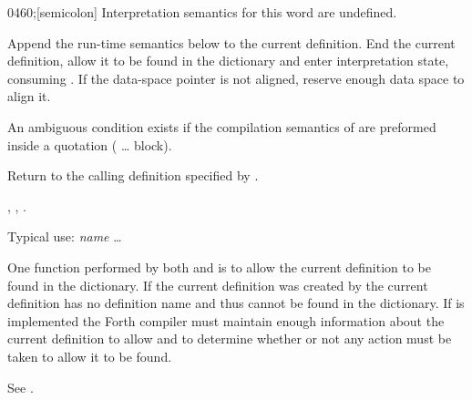 \pagebreak
\begin{worddef}{0460}{;}[semicolon]
\interpret
	Interpretation semantics for this word are undefined.

\compile

	Append the run-time semantics below to the current definition. End
	the current definition, allow it to be found in the dictionary and
	enter interpretation state, consuming . If the
	data-space pointer is not aligned, reserve enough data space to
	align it.

	An ambiguous condition exists if the compilation semantics of
	\word{;} are preformed inside a quotation (\word[tools]{[:} {\ldots}
	\word[tools]{;]} block).
	
\runtime
	\stack{}{}

	Return to the calling definition specified by .

\see {},
	,
	.

	\begin{rationale} %
		Typical use:
			\word{:} \emph{name} {\ldots} \word{;}

		One function performed by both \word{;} and 
		is to allow the current definition to be found in the
		dictionary. If the current definition was created by
		 the current definition has no definition name
		and thus cannot be found in the dictionary. If 
		is implemented the Forth compiler must maintain enough
		information about the current definition to allow \word{;} and
		 to determine whether or not any action must
		be taken to allow it to be found.
	\end{rationale}

	\begin{testing} %
		See .
	\end{testing}
\end{worddef}


